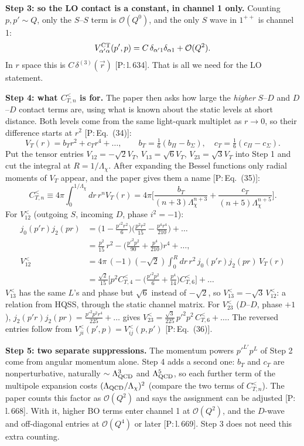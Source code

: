 \documentclass[11pt,a4paper]{article}
\newcommand{\tagP}[1]{\textcolor{blue!65!black}{\textsf{\small[P:\,#1]}}}
\newenvironment{aiadd}{\par}{\par}
\begin{document}
\begin{aiadd}
	\textbf{Step 3: so the LO contact is a constant, in channel 1 only.} Counting $p,p'\sim Q$, only the $S$--$S$ term is $\mathcal O(Q^0)$, and the only $S$ wave in $1^{++}$ is channel 1:
	\[
		V^{\rm CT}_{\alpha'\alpha}(p',p)=C\,\delta_{\alpha'1}\delta_{\alpha1}+\mathcal O(Q^2).
	\]
	In $r$ space this is $C\,\delta^{(3)}(\vec r)$ \tagP{l.\,634}. That is all we need for the LO statement.

	\textbf{Step 4: what $C^<_{T,n}$ is for.} The paper then asks how large the \emph{higher} $S$--$D$ and $D$--$D$ contact terms are, using what is known about the static levels at short distance. Both levels come from the same light-quark multiplet as $r\to0$, so their difference starts at $r^2$ \tagP{Eq.~(34)}:
	\[
		V_T(r)=b_Tr^2+c_Tr^4+\dots,\qquad b_T=\tfrac16(b_\Pi-b_\Sigma),\quad c_T=\tfrac16(c_\Pi-c_\Sigma).
	\]
	Put the tensor entries $V_{12}=-\sqrt2V_T$, $V_{13}=\sqrt6V_T$, $V_{23}=\sqrt3V_T$ into Step 1 and cut the integral at $R=1/\Lambda_\chi$. After expanding the Bessel functions only radial moments of $V_T$ appear, and the paper gives them a name \tagP{Eq.~(35)}:
	\[
		C^<_{T,n}\equiv4\pi\int_0^{1/\Lambda_\chi}dr\,r^nV_T(r)=4\pi\Big[\frac{b_T}{(n+3)\Lambda_\chi^{n+3}}+\frac{c_T}{(n+5)\Lambda_\chi^{n+5}}\Big].
	\]
	For $V^<_{12}$ (outgoing $S$, incoming $D$, phase $i^2=-1$):
	\begin{align*}
		j_0(p'r)j_2(pr) & =\Big(1-\frac{p'^2r^2}{6}\Big)\Big(\frac{p^2r^2}{15}-\frac{p^4r^4}{210}\Big)+\dots                 \\
		                & =\frac{p^2}{15}\,r^2-\Big(\frac{p'^2p^2}{90}+\frac{p^4}{210}\Big)r^4+\dots,                        \\
		V^<_{12}        & =4\pi\,(-1)(-\sqrt2)\int_0^Rdr\,r^2\,j_0(p'r)j_2(pr)\,V_T(r)                                       \\
		                & =\frac{\sqrt2}{15}\Big[p^2C^<_{T,4}-\Big(\frac{p'^2p^2}{6}+\frac{p^4}{14}\Big)C^<_{T,6}\Big]+\dots
	\end{align*}
	$V^<_{13}$ has the same $L$'s and phase but $\sqrt6$ instead of $-\sqrt2$, so $V^<_{13}=-\sqrt3\,V^<_{12}$: a relation from HQSS, through the static channel matrix. For $V^<_{23}$ ($D$--$D$, phase $+1$), $j_2(p'r)j_2(pr)=\frac{p'^2p^2r^4}{225}+\dots$ gives $V^<_{23}=\frac{\sqrt3}{225}\,p'^2p^2\,C^<_{T,6}+\dots$. The reversed entries follow from $V^<_{ji}(p',p)=V^<_{ij}(p,p')$ \tagP{Eq.~(36)}.

	\textbf{Step 5: two separate suppressions.} The momentum powers $p'^{L'}p^L$ of Step 2 come from angular momentum alone. Step 4 adds a second one: $b_T$ and $c_T$ are nonperturbative, naturally $\sim\Lambda_{\rm QCD}^3$ and $\Lambda_{\rm QCD}^5$, so each further term of the multipole expansion costs $(\Lambda_{\rm QCD}/\Lambda_\chi)^2$ (compare the two terms of $C^<_{T,n}$). The paper counts this factor as $\mathcal O(Q^2)$ and says the assignment can be adjusted \tagP{l.\,668}. With it, higher BO terms enter channel 1 at $\mathcal O(Q^2)$, and the $D$-wave and off-diagonal entries at $\mathcal O(Q^4)$ or later \tagP{l.\,669}. Step 3 does not need this extra counting.


\end{aiadd}
\end{document}
